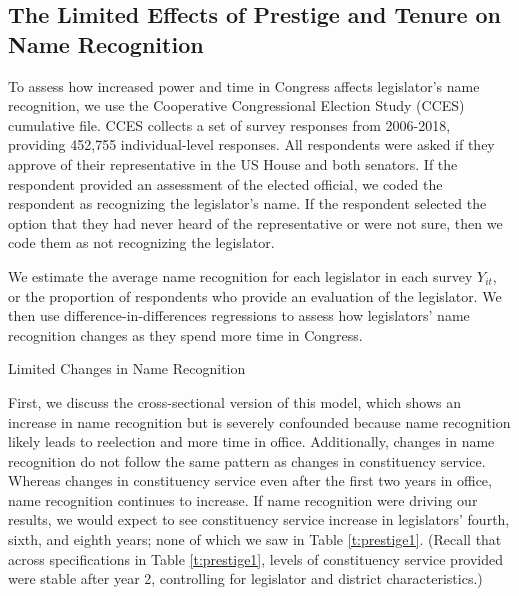 \documentclass[12pt]{article}
\begin{document}
\subsection{The Limited Effects of Prestige and Tenure on Name Recognition}
To assess how increased power and time in Congress affects legislator's name recognition, we use the Cooperative Congressional Election Study (CCES) cumulative file. CCES collects a set of survey responses from 2006-2018, providing 452,755 individual-level responses. All respondents were asked if they approve of their representative in the US House and both senators. If the respondent provided an assessment of the elected official, we coded the respondent as recognizing the legislator's name. If the respondent selected the option that they had never heard of the representative or were not sure, then we code them as not recognizing the legislator.

We estimate the average name recognition for each legislator in each survey $Y_{it}$, or the proportion of respondents who provide an evaluation of the legislator. We then use difference-in-differences regressions to assess how legislators' name recognition changes as they spend more time in Congress.  

\begin{table}[hbt!]
\caption{Limited Changes in Name Recognition} \label{t:namerec1}

\begin{minipage}{\textwidth}
\begin{center}

\end{center}
\end{minipage}
\end{table}

First, we discuss the cross-sectional version of this model, which shows an increase in name recognition but is severely confounded because name recognition likely leads to reelection and more time in office. Additionally, changes in name recognition do not follow the same pattern as changes in constituency service. Whereas changes in constituency service even after the first two years in office, name recognition continues to increase. If name recognition were driving our results, we would expect to see constituency service increase in legislators' fourth, sixth, and eighth years; none of which we saw in Table \ref{t:prestige1}. (Recall that across specifications in Table \ref{t:prestige1}, levels of constituency service provided were stable after year 2, controlling for legislator and district characteristics.)
\end{document}
